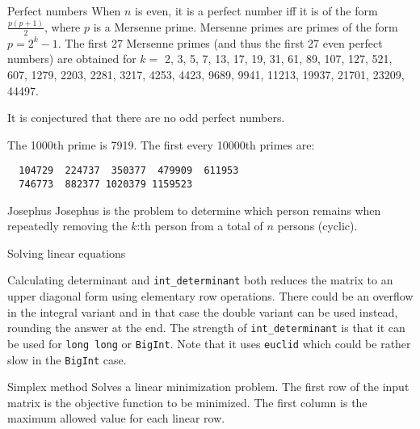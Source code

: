 \categorycontents{}


\begin{algorithm}{Perfect numbers}
\desc
When $n$ is even, it is a perfect number iff it is of the form
$\frac{p (p+1)}{2}$, where $p$ is a Mersenne prime. Mersenne primes are primes
of the form $p = 2^k - 1$. The first 27 Mersenne primes (and thus the first 27
even perfect numbers) are obtained for $k =$ 2, 3, 5, 7, 13, 17, 19, 31, 61,
89, 107, 127, 521, 607, 1279, 2203, 2281, 3217, 4253, 4423, 9689, 9941, 11213,
19937, 21701, 23209, 44497.

It is conjectured that there are no odd perfect numbers.
\end{algorithm}


The 1000th prime is 7919. The first every 10000th primes are:
{\small
\begin{verbatim}
  104729  224737  350377  479909  611953
  746773  882377 1020379 1159523
\end{verbatim}
}

\begin{algorithm}{Josephus}
\desc
Josephus is the problem to determine which person remains when repeatedly
removing the $k$:th person from a total of $n$ persons (cyclic).
\end{algorithm}

\begin{algorithm}{Solving linear equations}
\end{algorithm}

\begin{algorithm}{Calculating determinant}
 and {\tt int\_determinant} both reduces the matrix
to an upper diagonal form using elementary row operations. There could be an
overflow in the integral variant and in that case the double variant
can be used instead, rounding the answer at the end. The strength of
{\tt int\_determinant} is that it can be used for {\tt long long} or
{\tt BigInt}. Note that it uses {\tt euclid} which could be rather
slow in the {\tt BigInt} case.
\end{algorithm}

\begin{algorithm}{Simplex method}
\desc
Solves a linear minimization problem. The first row of the
input matrix is the objective function to be minimized. The
first column is the maximum allowed value for each linear row.
\end{algorithm}

